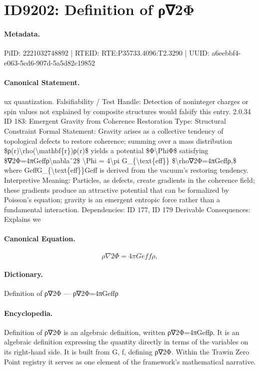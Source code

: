 \section*{ID9202: Definition of ρ∇2Φ}
\paragraph{Metadata.}
PiID: 2221032748892 | RTEID: RTE:P35733.4096:T2.3290 | UUID: a6eebbf4-e063-5cd6-907d-5a5d82c19852

\paragraph{Canonical Statement.}
ux quantization. Falsifiability / Test Handle: Detection of noninteger charges or spin values not explained by composite structures would falsify this entry. 2.0.34 ID 183: Emergent Gravity from Coherence Restoration Type: Structural Constraint Formal Statement: Gravity arises as a collective tendency of topological defects to restore coherence; summing over a mass distribution \$ρ(r)\textbackslash{}rho(\textbackslash{}mathbf\{r\})ρ(r)\$ yields a potential \$Φ\textbackslash{}PhiΦ\$ satisfying \$∇2Φ=4πGeffρ\textbackslash{}nablaˆ2\$ \textbackslash{}Phi = 4\textbackslash{}pi G\_\{\textbackslash{}text\{eff\}\} \$\textbackslash{}rho∇2Φ=4πGeffρ,\$ where GeffG\_\{\textbackslash{}text\{eff\}\}Geff is derived from the vacuum’s restoring tendency. Interpretive Meaning: Particles, as defects, create gradients in the coherence field; these gradients produce an attractive potential that can be formalized by Poisson’s equation; gravity is an emergent entropic force rather than a fundamental interaction. Dependencies: ID 177, ID 179 Derivable Consequences: Explains we

\paragraph{Canonical Equation.}
\[
\rho∇2Φ=4πGeffρ,
\]

\paragraph{Dictionary.}
Definition of ρ∇2Φ — ρ∇2Φ=4πGeffρ

\paragraph{Encyclopedia.}
Definition of ρ∇2Φ is an algebraic definition, written ρ∇2Φ=4πGeffρ. It is an algebraic definition expressing the quantity directly in terms of the variables on its right-hand side. It is built from G, f, defining ρ∇2Φ. Within the Trawin Zero Point registry it serves as one element of the framework's mathematical narrative.
